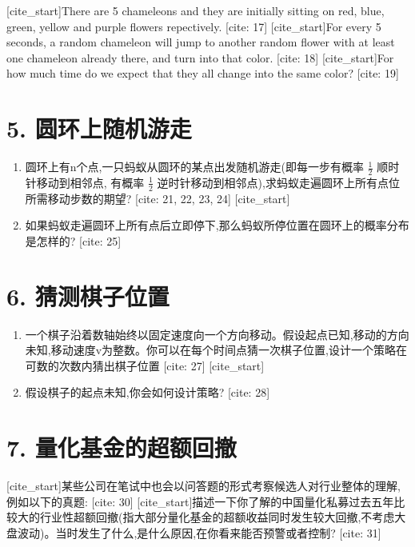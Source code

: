 \documentclass{article}
\begin{document}
[cite_start]There are 5 chameleons and they are initially sitting on red, blue, green, yellow and purple flowers repectively. [cite: 17] [cite_start]For every 5 seconds, a random chameleon will jump to another random flower with at least one chameleon already there, and turn into that color. [cite: 18] [cite_start]For how much time do we expect that they all change into the same color? [cite: 19]

\section*{5. 圆环上随机游走}

\begin{enumerate}
    \item 圆环上有n个点,一只蚂蚁从圆环的某点出发随机游走(即每一步有概率 $\frac{1}{2}$ 顺时针移动到相邻点, 有概率 $\frac{1}{2}$ 逆时针移动到相邻点),求蚂蚁走遍圆环上所有点位所需移动步数的期望? [cite: 21, 22, 23, 24]
    [cite_start]\item 如果蚂蚁走遍圆环上所有点后立即停下,那么蚂蚁所停位置在圆环上的概率分布是怎样的? [cite: 25]
\end{enumerate}

\section*{6. 猜测棋子位置}

\begin{enumerate}
    \item 一个棋子沿着数轴始终以固定速度向一个方向移动。假设起点已知,移动的方向未知,移动速度v为整数。你可以在每个时间点猜一次棋子位置,设计一个策略在可数的次数内猜出棋子位置 [cite: 27]
    [cite_start]\item 假设棋子的起点未知,你会如何设计策略? [cite: 28]
\end{enumerate}

\section*{7. 量化基金的超额回撤}

[cite_start]某些公司在笔试中也会以问答题的形式考察候选人对行业整体的理解,例如以下的真题: [cite: 30]
[cite_start]描述一下你了解的中国量化私募过去五年比较大的行业性超额回撤(指大部分量化基金的超额收益同时发生较大回撤,不考虑大盘波动)。当时发生了什么,是什么原因,在你看来能否预警或者控制? [cite: 31]
\end{document}
